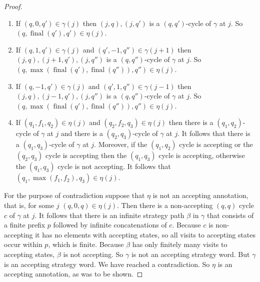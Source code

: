 \documentclass[10pt,a4paper]{amsart}
\theoremstyle{plain}
\theoremstyle{definition}
\theoremstyle{definition}
\DeclareMathOperator{\?}{?}
\DeclareMathOperator{\final}{final}
\begin{document}
\begin{proof}
\begin{enumerate}
\item
If $(q,0,q') \in \gamma(j)$ then $(j,q),(j,q')$ is a $(q,q')$-cycle of $\gamma$ at $j$. So $(q,\final(q'),q') \in \eta(j)$.
\item
If $(q,1,q') \in \gamma(j)$ and $(q',-1,q'') \in \gamma(j+1)$ then $(j,q),(j+1,q'),(j,q'')$ is a $(q,q'')$-cycle of $\gamma$ at $j$. So $(q,\max(\final(q'),\final(q'')),q'') \in \eta(j)$.
\item
If $(q,-1,q') \in \gamma(j)$ and $(q',1,q'') \in \gamma(j-1)$ then $(j,q),(j-1,q'),(j,q'')$ is a $(q,q'')$-cycle of $\gamma$ at $j$. So $(q,\max(\final(q'),\final(q'')),q'') \in \eta(j)$.
\item
If $(q_1,f_1,q_2) \in \eta(j)$ and $(q_2,f_2,q_3) \in \eta(j)$ then there is a $(q_1,q_2)$-cycle of $\gamma$ at $j$ and there is a $(q_2,q_3)$-cycle of $\gamma$ at $j$. It follows that there is a $(q_1,q_3)$-cycle of $\gamma$ at $j$. Moreover, if the $(q_1,q_2)$ cycle is accepting or the $(q_2,q_3)$ cycle is accepting then the $(q_1,q_3)$ cycle is accepting, otherwise the $(q_1,q_3)$ cycle is not accepting. It follows that $(q_1,\max(f_1,f_2),q_3) \in \eta(j)$.
\end{enumerate}

For the purpose of contradiction suppose that $\eta$ is not an accepting annotation, that is, for some $j$ $(q,0,q) \in \eta(j)$. Then there is a non-accepting $(q,q)$ cycle $c$ of $\gamma$ at $j$. It follows that there is an infinite strategy path $\beta$ in $\gamma$ that consists of a finite prefix $p$ followed by infinite concatenations of $c$. Because $c$ is non-accepting it has no elements with accepting states, so all visits to accepting states occur within $p$, which is finite. Because $\beta$ has only finitely many visits to accepting states, $\beta$ is not accepting. So $\gamma$ is not an accepting strategy word. But $\gamma$ is an accepting strategy word. We have reached a contradiction. So $\eta$ is an accepting annotation, as was to be shown.
\end{proof}
\end{document}
